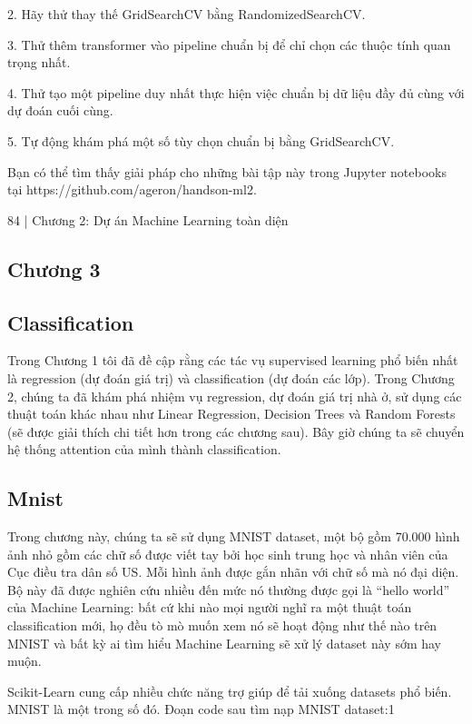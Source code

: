 2. Hãy thử thay thế GridSearchCV bằng RandomizedSearchCV.

3. Thử thêm transformer vào pipeline chuẩn bị để chỉ chọn các thuộc tính quan trọng nhất.

4. Thử tạo một pipeline duy nhất thực hiện việc chuẩn bị dữ liệu đầy đủ cùng với dự đoán cuối cùng.

5. Tự động khám phá một số tùy chọn chuẩn bị bằng GridSearchCV.

Bạn có thể tìm thấy giải pháp cho những bài tập này trong Jupyter notebooks tại https://github.com/ageron/handson-ml2.

84 | Chương 2: Dự án Machine Learning toàn diện

\subsection{Chương 3}

\subsection{Classification}

Trong Chương 1 tôi đã đề cập rằng các tác vụ supervised learning phổ biến nhất là regression (dự đoán giá trị) và classification (dự đoán các lớp). Trong Chương 2, chúng ta đã khám phá nhiệm vụ regression, dự đoán giá trị nhà ở, sử dụng các thuật toán khác nhau như Linear Regression, Decision Trees và Random Forests (sẽ được giải thích chi tiết hơn trong các chương sau). Bây giờ chúng ta sẽ chuyển hệ thống attention của mình thành classification.

\subsection{Mnist}

Trong chương này, chúng ta sẽ sử dụng MNIST dataset, một bộ gồm 70.000 hình ảnh nhỏ gồm các chữ số được viết tay bởi học sinh trung học và nhân viên của Cục điều tra dân số US. Mỗi hình ảnh được gắn nhãn với chữ số mà nó đại diện. Bộ này đã được nghiên cứu nhiều đến mức nó thường được gọi là “hello world” của Machine Learning: bất cứ khi nào mọi người nghĩ ra một thuật toán classification mới, họ đều tò mò muốn xem nó sẽ hoạt động như thế nào trên MNIST và bất kỳ ai tìm hiểu Machine Learning sẽ xử lý dataset này sớm hay muộn.

Scikit-Learn cung cấp nhiều chức năng trợ giúp để tải xuống datasets phổ biến. MNIST là một trong số đó. Đoạn code sau tìm nạp MNIST dataset:1

